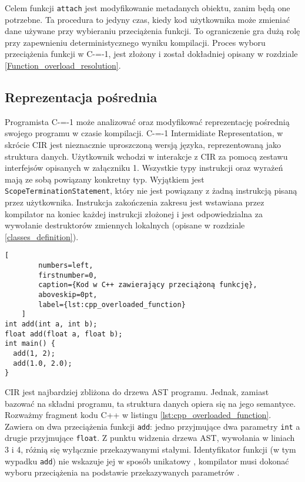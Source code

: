 Celem funkcji \lstinline{attach} jest modyfikowanie metadanych obiektu, zanim będą one potrzebne.
Ta procedura to jedyny czas, kiedy kod użytkownika może zmieniać dane używane przy wybieraniu przeciążenia funkcji.
To ograniczenie gra dużą rolę przy zapewnieniu deterministycznego wyniku kompilacji.
Proces wyboru przeciążenia funkcji w C-=-1, jest złożony i został dokładniej opisany w rozdziale \ref{Function_overload_resolution}.


\subsection{Reprezentacja pośrednia}\label{reprezentacja_posrednia}
Programista C-=-1 może analizować oraz modyfikować reprezentację pośrednią swojego programu w czasie kompilacji.
C-=-1 Intermidiate Representation, w skrócie CIR jest nieznacznie uproszczoną wersją języka, reprezentowaną jako struktura danych.
Użytkownik wchodzi w interakcje z CIR za pomocą zestawu interfejsów opisanych w załączniku 1.
Wszystkie typy instrukcji oraz wyrażeń mają ze sobą powiązany konkretny typ.
Wyjątkiem jest \lstinline{ScopeTerminationStatement}, który nie jest powiązany z żadną instrukcją pisaną przez użytkownika.
Instrukcja zakończenia zakresu jest wstawiana przez kompilator na koniec każdej instrukcji złożonej i jest odpowiedzialna za wywołanie destruktorów zmiennych lokalnych (opisane w rozdziale \ref{classes_definition}).

\begin{minipage}{\linewidth}
	\begin{lstlisting}[
		numbers=left,
		firstnumber=0,
		caption={Kod w C++ zawierający przeciążoną funkcję},
		aboveskip=0pt,
		label={lst:cpp_overloaded_function}
	]
int add(int a, int b);
float add(float a, float b);
int main() {
  add(1, 2);
  add(1.0, 2.0);
}
	\end{lstlisting}
\end{minipage}

CIR jest najbardziej zbliżona do drzewa AST programu.
Jednak, zamiast bazować na składni programu, ta struktura danych opiera się na jego semantyce.
Rozważmy fragment kodu C++ w listingu \ref{lst:cpp_overloaded_function}.
Zawiera on dwa przeciążenia funkcji \lstinline{add}: jedno przyjmujące dwa parametry \lstinline{int} a drugie przyjmujące \lstinline{float}.
Z punktu widzenia drzewa AST, wywołania w liniach 3 i 4, różnią się wyłącznie przekazywanymi stałymi.
Identyfikator funkcji (w tym wypadku \lstinline{add}) nie wskazuje jej w sposób unikatowy \cite{ISO:cpp20}, kompilator musi dokonać wyboru przeciążenia na podstawie przekazywanych parametrów \cite{cpp:function_overload_frontend}.

